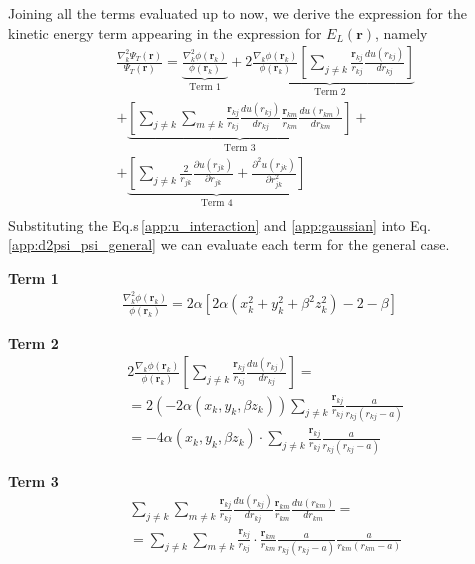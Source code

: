 Joining all the terms evaluated up to now, we derive the expression for the kinetic energy term appearing in the expression for $E_L(\bm{r})$, namely
\begin{align}
     &\frac{ \nabla_k^2 \Psi_T(\mathbf{r})}{\Psi_T(\mathbf{r})} =  \underbrace{\frac{\nabla_k^2 \phi(\mathbf{r}_k)}{\phi(\mathbf{r}_k)}}_{\text{Term 1}} 
     + \underbrace{2 \frac{\nabla_k \phi(\mathbf{r}_k)}{\phi(\mathbf{r}_k)} \left[ \sum_{j\neq k}  \frac{\mathbf{r}_{kj}}{r_{kj}} \frac{du(r_{kj})}{dr_{kj}} \right]}_{\text{Term 2}} \nonumber\\
     & + \underbrace{\left[ \sum_{j\neq k} \sum_{m \neq k} \frac{\mathbf{r}_{kj}}{r_{kj}} \frac{du(r_{kj})}{dr_{kj}} \frac{\mathbf{r}_{km}}{r_{km}} \frac{du(r_{km})}{dr_{km}} \right]}_{\text{Term 3}} + \nonumber\\
     & + \underbrace{\left[ \sum_{j\neq k} \frac{2}{r_{jk}} \frac{\partial u(r_{jk})}{\partial r_{jk}} + \frac{\partial^2 u(r_{jk})}{\partial r_{jk}^2} \right]}_{\text{Term 4}} \nonumber \\
     \label{app:d2psi_psi_general}
\end{align}
Substituting the Eq.s\,\ref{app:u_interaction} and \ref{app:gaussian} into Eq.\,\ref{app:d2psi_psi_general} we can evaluate each term for the general case. 

\textbf{Term 1}
\begin{align*}
    \frac{\nabla_k^2 \phi(\mathbf{r}_k)}{\phi(\mathbf{r}_k)} = 2 \alpha \left[  2 \alpha (x_k^2 + y_k^2 + \beta^2 z_k^2 ) -2 -\beta \right]
\end{align*}

\textbf{Term 2}
\begin{align*}
    &2 \frac{\nabla_k \phi(\mathbf{r}_k)}{\phi(\mathbf{r}_k)} \left[ \sum_{j\neq k}  \frac{\mathbf{r}_{kj}}{r_{kj}} \frac{du(r_{kj})}{dr_{kj}} \right] = \\
    &=2 \left( -2 \alpha \left( x_k, y_k, \beta z_k \right) \right) \sum_{j\neq k}  \frac{\mathbf{r}_{kj}}{r_{kj}} \frac{a}{r_{kj} \left( r_{kj} - a \right)} \\
    &= -4 \alpha \left( x_k, y_k, \beta z_k \right) \cdot \sum_{j\neq k}  \frac{\mathbf{r}_{kj}}{r_{kj}} \frac{a}{r_{kj} \left( r_{kj} - a \right)} 
\end{align*}


\textbf{Term 3}
\begin{align*}
    &\sum_{j\neq k} \sum_{m \neq k} \frac{\mathbf{r}_{kj}}{r_{kj}} \frac{du(r_{kj})}{dr_{kj}} \frac{\mathbf{r}_{km}}{r_{km}} \frac{du(r_{km})}{dr_{km}} = \\
    &= \sum_{j\neq k} \sum_{m \neq k} \frac{\mathbf{r}_{kj}}{r_{kj}} \cdot  \frac{\mathbf{r}_{km}}{r_{km}} \frac{a}{r_{kj} \left( r_{kj} - a \right)} \frac{a}{r_{km} \left( r_{km} - a \right)} 
\end{align*}


